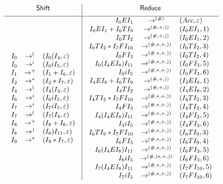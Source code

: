 \documentclass{jarticle}
\begin{document}
 \[
 \begin{array}{c|c}
  \mbox{\sf Shift} & \mbox{\sf Reduce}\\[5pt]\hline
 \begin{array}{rcl}
  I_0 & \rightarrow^{(} & (I_0(I_4,\varepsilon)\\
  I_0 & \rightarrow^{i} & (I_0iI_5,\varepsilon)\\
  I_1 & \rightarrow^{+} & (I_1+I_6,\varepsilon)\\
  I_2 & \rightarrow^{\ast} & (I_2\ast I_7,\varepsilon)\\
  I_4 & \rightarrow^{(} & (I_4(I_4,\varepsilon)\\
  I_6 & \rightarrow^{i} & (I_6iI_5,\varepsilon)\\
  I_7 & \rightarrow^{i} & (I_7iI_5,\varepsilon)\\
  I_7 & \rightarrow^{(} & (I_7(I_4,\varepsilon)\\
  I_8 & \rightarrow^{+} & (I_8+I_6,\varepsilon)\\
  I_8 & \rightarrow^{)} & (I_8)I_{11},\varepsilon)\\
  I_9 & \rightarrow^{\ast} & (I_9\ast I_7,\varepsilon)
 \end{array} &
 \begin{array}{rcl}
  I_0EI_1 & \rightarrow^{(\#)} & (Acc,\varepsilon)\\
  I_0EI_1+I_6TI_9 & \rightarrow^{(\#,+,))}&(I_0EI_1,1)\\
  I_0TI_2 & \rightarrow^{(\#,+,))} & (I_0EI_1,2)\\
  I_0TI_2\ast I_7FI_{10} & \rightarrow^{(\#,\ast,+,))}&(I_0TI_2,3)\\
  I_0FI_3 & \rightarrow^{(\#,\ast,+,))} & (I_0TI_2,4)\\
  I_0(I_4EI_8)I_{11} & \rightarrow^{(\#,\ast,+,))} & (I_0FI_3,5)\\
  I_0iI_5 & \rightarrow^{(\#,\ast,+,))} & (I_0FI_3,6)\\
  I_4EI_8+I_6TI_9 & \rightarrow^{(\#,+,))} & (I_4EI_8,1)\\
  I_4TI_2 & \rightarrow^{(\#,+,))} & (I_4EI_8,2)\\
  I_4TI_2\ast I_7FI_{10} & \rightarrow^{(\#,\ast,+,))}&(I_4TI_2,3)\\
  I_4FI_3 & \rightarrow^{(\#,\ast,+,))} & (I_4TI_2,4)\\
  I_4(I_4EI_8)I_{11} & \rightarrow^{(\#,\ast,+,))} & (I_4FI_3,5)\\
  I_4iI_5 & \rightarrow^{(\#,\ast,+,))} &
   (I_4FI_3,6)\\
  I_6TI_9\ast I_7FI_{10} & \rightarrow^{(\#,\ast,+,))}&(I_6TI_9,3)\\
  I_6FI_3 & \rightarrow^{(\#,\ast,+,))} & (I_6TI_9,4)\\
  I_6(I_4EI_8)I_{11} & \rightarrow^{(\#,\ast,+,))} & (I_6FI_3,5)\\
  I_6iI_5 & \rightarrow^{(\#,)\ast,+,))} &
   (I_6FI_3,6)\\
  I_7(I_4EI_8)I_{11} & \rightarrow^{(\#,\ast,+,))} & (I_7FI_{10},5)\\
  I_7iI_5 & \rightarrow^{(\#,\ast,+,))} &
   (I_7FI_{10},6)\\
 \end{array}
 \end{array}
 \]
\end{document}
